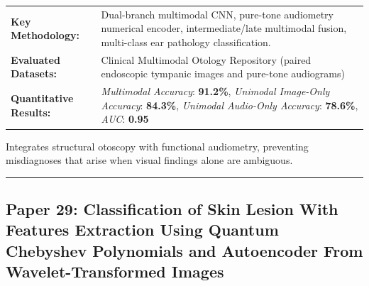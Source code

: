 \documentclass[10pt,a4paper]{article}
\begin{document}
\vspace{4pt}
\begin{tabularx}{\linewidth}{p{3.2cm}X}
\toprule
\textbf{Key Methodology:} & Dual-branch multimodal CNN, pure-tone audiometry numerical encoder, intermediate/late multimodal fusion, multi-class ear pathology classification. \\
\textbf{Evaluated Datasets:} & Clinical Multimodal Otology Repository (paired endoscopic tympanic images and pure-tone audiograms) \\
\textbf{Quantitative Results:} & \textit{Multimodal Accuracy}: \textbf{91.2\%}, \textit{Unimodal Image-Only Accuracy}: \textbf{84.3\%}, \textit{Unimodal Audio-Only Accuracy}: \textbf{78.6\%}, \textit{AUC}: \textbf{0.95} \\
\bottomrule
\end{tabularx}
\vspace{4pt}
\begin{tcolorbox}[utilitybox,title=Clinical Utility and Real-World Impact]
Integrates structural otoscopy with functional audiometry, preventing misdiagnoses that arise when visual findings alone are ambiguous.
\end{tcolorbox}
\vspace{12pt}
\hrule
\vspace{12pt}
\subsection*{Paper 29: Classification of Skin Lesion With Features Extraction Using Quantum Chebyshev Polynomials and Autoencoder From Wavelet-Transformed Images}
\end{document}
